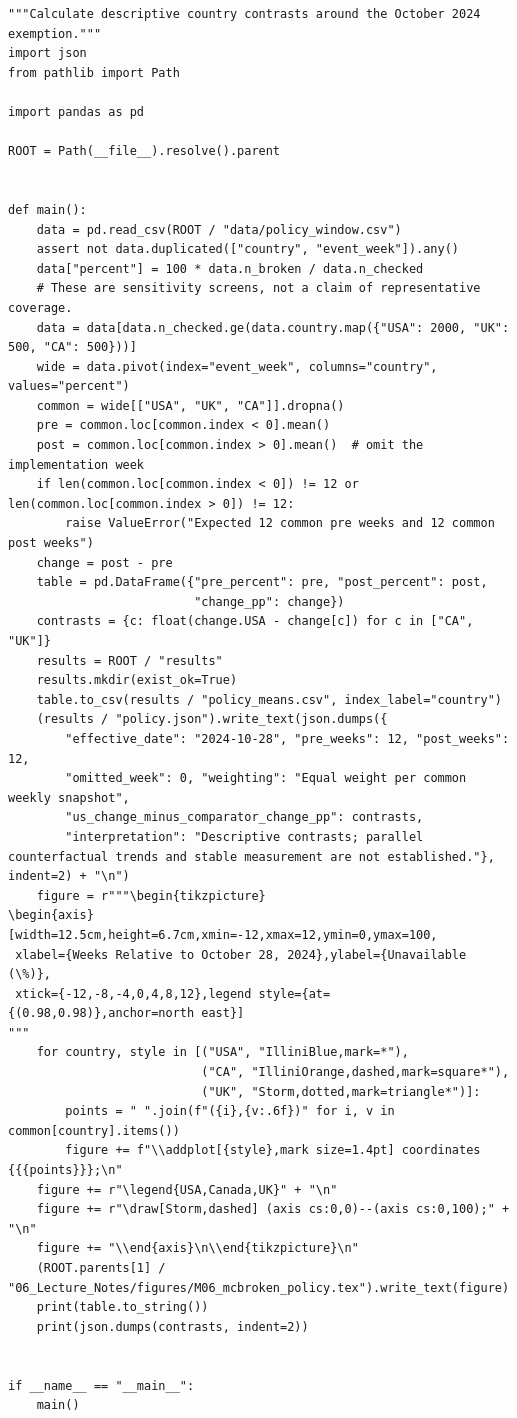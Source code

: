 \begin{Verbatim}[breaklines,breakanywhere,fontsize=\small]
"""Calculate descriptive country contrasts around the October 2024 exemption."""
import json
from pathlib import Path

import pandas as pd

ROOT = Path(__file__).resolve().parent


def main():
    data = pd.read_csv(ROOT / "data/policy_window.csv")
    assert not data.duplicated(["country", "event_week"]).any()
    data["percent"] = 100 * data.n_broken / data.n_checked
    # These are sensitivity screens, not a claim of representative coverage.
    data = data[data.n_checked.ge(data.country.map({"USA": 2000, "UK": 500, "CA": 500}))]
    wide = data.pivot(index="event_week", columns="country", values="percent")
    common = wide[["USA", "UK", "CA"]].dropna()
    pre = common.loc[common.index < 0].mean()
    post = common.loc[common.index > 0].mean()  # omit the implementation week
    if len(common.loc[common.index < 0]) != 12 or len(common.loc[common.index > 0]) != 12:
        raise ValueError("Expected 12 common pre weeks and 12 common post weeks")
    change = post - pre
    table = pd.DataFrame({"pre_percent": pre, "post_percent": post,
                          "change_pp": change})
    contrasts = {c: float(change.USA - change[c]) for c in ["CA", "UK"]}
    results = ROOT / "results"
    results.mkdir(exist_ok=True)
    table.to_csv(results / "policy_means.csv", index_label="country")
    (results / "policy.json").write_text(json.dumps({
        "effective_date": "2024-10-28", "pre_weeks": 12, "post_weeks": 12,
        "omitted_week": 0, "weighting": "Equal weight per common weekly snapshot",
        "us_change_minus_comparator_change_pp": contrasts,
        "interpretation": "Descriptive contrasts; parallel counterfactual trends and stable measurement are not established."}, indent=2) + "\n")
    figure = r"""\begin{tikzpicture}
\begin{axis}[width=12.5cm,height=6.7cm,xmin=-12,xmax=12,ymin=0,ymax=100,
 xlabel={Weeks Relative to October 28, 2024},ylabel={Unavailable (\%)},
 xtick={-12,-8,-4,0,4,8,12},legend style={at={(0.98,0.98)},anchor=north east}]
"""
    for country, style in [("USA", "IlliniBlue,mark=*"),
                           ("CA", "IlliniOrange,dashed,mark=square*"),
                           ("UK", "Storm,dotted,mark=triangle*")]:
        points = " ".join(f"({i},{v:.6f})" for i, v in common[country].items())
        figure += f"\\addplot[{style},mark size=1.4pt] coordinates {{{points}}};\n"
    figure += r"\legend{USA,Canada,UK}" + "\n"
    figure += r"\draw[Storm,dashed] (axis cs:0,0)--(axis cs:0,100);" + "\n"
    figure += "\\end{axis}\n\\end{tikzpicture}\n"
    (ROOT.parents[1] / "06_Lecture_Notes/figures/M06_mcbroken_policy.tex").write_text(figure)
    print(table.to_string())
    print(json.dumps(contrasts, indent=2))


if __name__ == "__main__":
    main()
\end{Verbatim}

